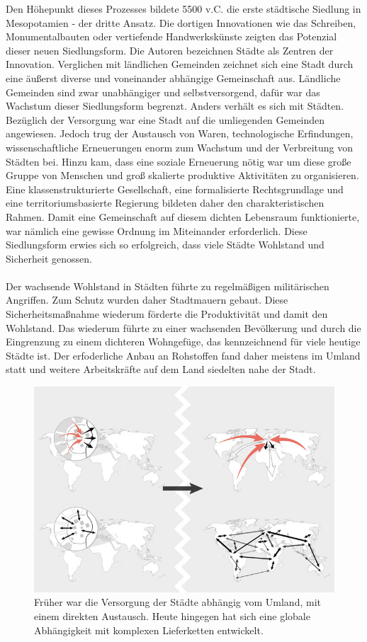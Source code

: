\documentclass{scrartcl}
\begin{document}
Den Höhepunkt dieses Prozesses bildete 5500 v.C. die erste städtische Siedlung in Mesopotamien - der dritte Ansatz. Die dortigen Innovationen wie das Schreiben, Monumentalbauten oder vertiefende Handwerkskünste zeigten das Potenzial dieser neuen Siedlungsform. Die Autoren bezeichnen Städte als Zentren der Innovation. Verglichen mit ländlichen Gemeinden zeichnet sich eine Stadt durch eine äußerst diverse und voneinander abhängige Gemeinschaft aus. Ländliche Gemeinden sind zwar unabhängiger und selbstversorgend, dafür war das Wachstum dieser Siedlungsform begrenzt. Anders verhält es sich mit Städten. Bezüglich der Versorgung war eine Stadt auf die umliegenden Gemeinden angewiesen. Jedoch trug der Austausch von Waren, technologische Erfindungen, wissenschaftliche Erneuerungen enorm zum Wachstum und der Verbreitung von Städten bei. Hinzu kam, dass eine soziale Erneuerung nötig war um diese große Gruppe von Menschen und groß skalierte produktive Aktivitäten zu organisieren. Eine klassenstrukturierte Gesellschaft, eine formalisierte Rechtsgrundlage und eine territoriumsbasierte Regierung bildeten daher den charakteristischen Rahmen. Damit eine Gemeinschaft auf diesem dichten Lebensraum funktionierte, war nämlich eine gewisse Ordnung im Miteinander erforderlich. Diese Siedlungsform erwies sich so erfolgreich, dass viele Städte Wohlstand und Sicherheit genossen. 
\\
\\
Der wachsende Wohlstand in Städten führte zu regelmäßigen militärischen Angriffen. Zum Schutz wurden daher Stadtmauern gebaut. Diese Sicherheitsmaßnahme wiederum förderte die Produktivität und damit den Wohlstand. Das wiederum führte zu einer wachsenden Bevölkerung und durch die Eingrenzung zu einem dichteren Wohngefüge, das kennzeichnend für viele heutige Städte ist. Der erfoderliche Anbau an Rohstoffen fand daher meistens im Umland statt und weitere Arbeitskräfte auf dem Land siedelten nahe der Stadt.

\begin{figure}[h]
\centering
\includegraphics[width=12cm]{image_folder/connections_1.jpg}
\caption{Früher war die Versorgung der Städte abhängig vom Umland, mit einem direkten Austausch. Heute hingegen hat sich eine globale Abhängigkeit mit komplexen Lieferketten entwickelt.}
\label{fig:verbindungen}
\end{figure}
\end{document}

